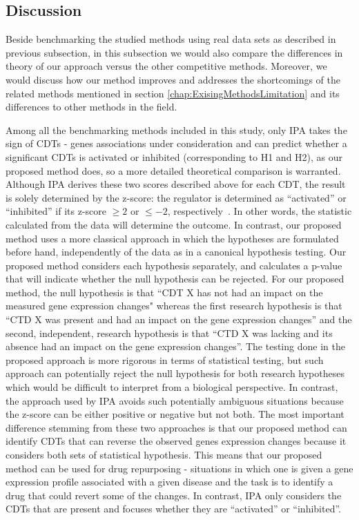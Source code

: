\subsection{Discussion}

Beside  benchmarking the studied methods using real data sets as described in previous subsection, in this subsection we  would also compare the differences in theory of our approach versus the other competitive methods.
Moreover, we would discuss how our method improves and addresses the shortcomings of the related methods mentioned in section \ref{chap:ExisingMethodsLimitation} and its differences to other methods in the field. 

Among all the benchmarking methods included in this study, only IPA takes the sign of CDTs - genes associations under consideration and can predict whether a significant CDTs is activated or inhibited (corresponding to H1 and H2), as our proposed method does, so a more detailed theoretical comparison is warranted.
Although IPA derives these two scores  described above for each CDT, the result is solely determined by the z-score: the regulator is determined as ``activated''  or ``inhibited'' if its z-score $\geq 2$ or $\leq -2$, respectively~\cite{kramer2013causal}. In other words, the statistic calculated from the data will determine the outcome. In contrast, our proposed method uses a more classical approach in which the hypotheses are formulated before hand, independently of the data as in a canonical hypothesis testing. Our proposed method  considers each hypothesis separately, and calculates a p-value that will indicate whether the null hypothesis can be rejected. 
For our proposed method, the null hypothesis is that ``CDT X has not had an impact on the measured gene expression changes" whereas the first research hypothesis is that ``CTD X was present and had an impact on the gene expression changes'' and the second, independent, research hypothesis is that ``CTD X was lacking and its absence had an impact on the gene expression changes''. 
The testing done in the proposed approach is more rigorous in terms of statistical testing, but such approach can potentially reject the null hypothesis for both research hypotheses which would be difficult to interpret from a biological perspective. In contrast, the approach used by IPA avoids such potentially ambiguous situations because the z-score can be either positive or negative but not both. The most important difference stemming from these two approaches is that our proposed method  can identify CDTs that can reverse the observed genes expression changes because it considers both sets of statistical hypothesis. This means that our proposed method can be used for drug repurposing - situations in which one is given a   gene expression profile associated with a given disease and the task is to identify a drug that could revert some of the changes. In contrast, IPA only considers the CDTs that are present and focuses whether they are ``activated'' or ``inhibited''. 
